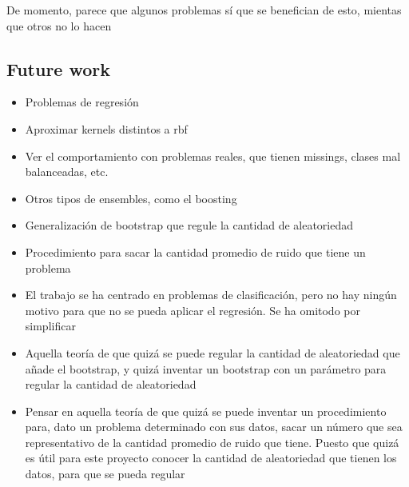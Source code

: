 De momento, parece que algunos problemas sí que se benefician de esto, mientas
que otros no lo hacen


\subsection*{Future work}

\begin{note}
  \begin{itemize}
    \item Problemas de regresión
    \item Aproximar kernels distintos a rbf
    \item Ver el comportamiento con problemas reales, que tienen missings,
    clases mal balanceadas, etc.
    \item Otros tipos de ensembles, como el boosting
    \item Generalización de bootstrap que regule la cantidad de aleatoriedad
    \item Procedimiento para sacar la cantidad promedio de ruido que tiene un
    problema
  \end{itemize}
\end{note}
\begin{itemize}
 \item El trabajo se ha centrado en problemas de clasificación, pero no hay
       ningún motivo para que no se pueda aplicar el regresión. Se ha omitodo por
       simplificar
 \item Aquella teoría de que quizá se puede regular la cantidad de aleatoriedad
       que añade el bootstrap, y quizá inventar un bootstrap con un parámetro para
       regular la cantidad de aleatoriedad
 \item Pensar en aquella teoría de que quizá se puede inventar un procedimiento
       para, dato un problema determinado con sus datos, sacar un número que sea
       representativo de la cantidad promedio de ruido que tiene. Puesto que quizá
       es útil para este proyecto conocer la cantidad de aleatoriedad que tienen
       los datos, para que se pueda regular
\end{itemize}
